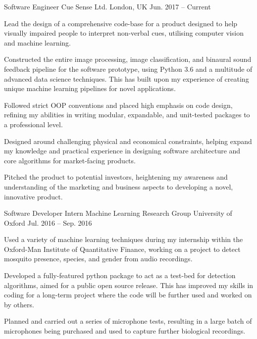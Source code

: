 \begin{cventries}
    \cventry
    {Software Engineer}
    {Cue Sense Ltd.}
    {London, UK}
    {Jun. 2017 – Current}
    {
      \begin{cvitems}
        \item {Lead the design of a comprehensive code-base for a product designed to help visually impaired people to interpret non-verbal cues, utilising computer vision and machine learning.}
        \item {Constructed the entire image processing, image classification, and binaural sound feedback pipeline for the software prototype, using Python 3.6 and a multitude of advanced data science techniques. This has built upon my experience of creating unique machine learning pipelines for novel applications.}
        \item{Followed strict OOP conventions and placed high emphasis on code design, refining my abilities in writing modular, expandable, and unit-tested packages to a professional level.}
        \item {Designed around challenging physical and economical constraints, helping expand my knowledge and practical experience in designing software architecture and core algorithms for market-facing products.}
        \item {Pitched the product to potential investors, heightening my awareness and understanding of the marketing and business aspects to developing a novel, innovative product.}
      \end{cvitems}
    }
    \cventry
    {Software Developer Intern}
    {Machine Learning Research Group}
    {University of Oxford}
    {Jul. 2016 – Sep. 2016}
    {
      \begin{cvitems}
        \item {Used a variety of machine learning techniques during my internship within the Oxford-Man Institute of Quantitative Finance, working on a project to detect mosquito presence, species, and gender from audio recordings.}
        \item {Developed a fully-featured python package to act as a test-bed for detection algorithms, aimed for a public open source release. This has improved my skills in coding for a long-term project where the code will be further used and worked on by others.}
        \item {Planned and carried out a series of microphone tests, resulting in a large batch of microphones being purchased and used to capture further biological recordings.}

\end{cvitems}}
\end{cventries}
